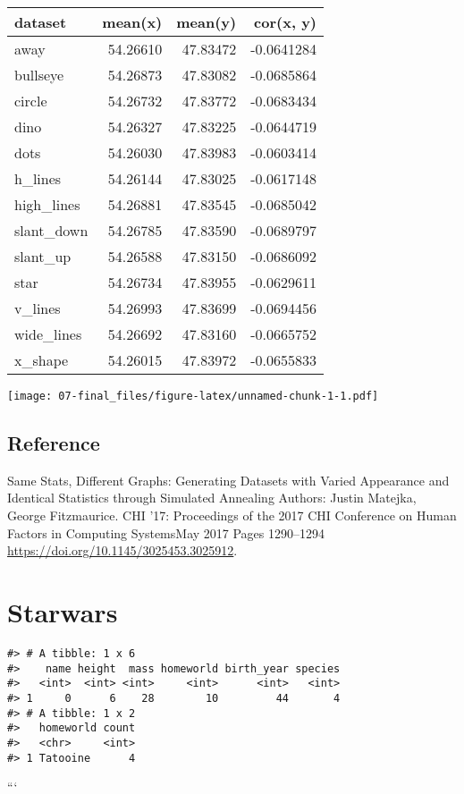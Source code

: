 \documentclass[
]{book}
\begin{document}
\begin{tabular}{l|r|r|r}
\hline
dataset & mean(x) & mean(y) & cor(x, y)\\
\hline
away & 54.26610 & 47.83472 & -0.0641284\\
\hline
bullseye & 54.26873 & 47.83082 & -0.0685864\\
\hline
circle & 54.26732 & 47.83772 & -0.0683434\\
\hline
dino & 54.26327 & 47.83225 & -0.0644719\\
\hline
dots & 54.26030 & 47.83983 & -0.0603414\\
\hline
h\_lines & 54.26144 & 47.83025 & -0.0617148\\
\hline
high\_lines & 54.26881 & 47.83545 & -0.0685042\\
\hline
slant\_down & 54.26785 & 47.83590 & -0.0689797\\
\hline
slant\_up & 54.26588 & 47.83150 & -0.0686092\\
\hline
star & 54.26734 & 47.83955 & -0.0629611\\
\hline
v\_lines & 54.26993 & 47.83699 & -0.0694456\\
\hline
wide\_lines & 54.26692 & 47.83160 & -0.0665752\\
\hline
x\_shape & 54.26015 & 47.83972 & -0.0655833\\
\hline
\end{tabular}

\texttt{[image: 07-final\_files/figure-latex/unnamed-chunk-1-1.pdf]}

\hypertarget{reference}{%
\subsection{Reference}\label{reference}}

Same Stats, Different Graphs: Generating Datasets with Varied Appearance and Identical Statistics through Simulated Annealing Authors: Justin Matejka, George Fitzmaurice. CHI '17: Proceedings of the 2017 CHI Conference on Human Factors in Computing SystemsMay 2017 Pages 1290--1294 \url{https://doi.org/10.1145/3025453.3025912}.

\hypertarget{starwars-1}{%
\section{Starwars}\label{starwars-1}}

\begin{verbatim}
#> # A tibble: 1 x 6
#>    name height  mass homeworld birth_year species
#>   <int>  <int> <int>     <int>      <int>   <int>
#> 1     0      6    28        10         44       4
#> # A tibble: 1 x 2
#>   homeworld count
#>   <chr>     <int>
#> 1 Tatooine      4
\end{verbatim}

```

  
\end{document}
